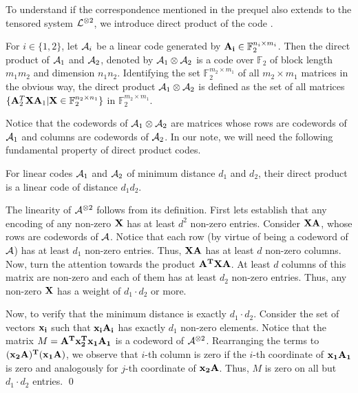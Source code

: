 {To understand if the correspondence mentioned in the prequel also
extends to the tensored system ${\cal L}^{\otimes 2}$, we introduce direct
product of the code \cite{ECC}. %
\begin{definition}
  For $i \in \{1, 2\}$, let ${\cal A}_i$ be a linear code generated by ${\bf
    A_i} \in \mathbb{F}_2^{n_i \times m_i}$.  Then the direct product
  of ${\cal A}_1$ and ${\cal A}_2$, denoted by ${\cal A}_1 \otimes {\cal A}_2$ is a code over
  $\mathbb{F}_2$ of block length $m_1m_2$ and dimension
  $n_1n_2$. Identifying the set $\mathbb{F}_2^{m_2 \times m_1}$ of all
  $m_2 \times m_1$ matrices in the obvious way, the direct product
  ${\cal A}_1 \otimes {\cal A}_2$ is defined as the set of all matrices $\{{\bf
    A}_2^T {\bf XA}_1 | {\bf X} \in \mathbb{F}_2^{n_2 \times n_1} \}$
  in $\mathbb{F}_2^{m_2 \times m_1}$.
\end{definition}

Notice that the codewords of ${\cal A}_1 \otimes {\cal A}_2$ are matrices whose
rows are codewords of ${\cal A}_1$ and columns are codewords of ${\cal A}_2$. In
our note, we will need the following fundamental property of direct
product codes.

\begin{claim} \label{distance} For linear codes ${\cal A}_1$ and ${\cal A}_2$ of
  minimum distance $d_1$ and $d_2$, their direct product is a linear
  code of distance $d_1d_2$.
\end{claim}
 The linearity of ${\cal A}^{\otimes 2}$ follows from
its definition.  First lets establish that any encoding of any
non-zero ${\bf X}$ has at least $d^2$ non-zero entries.  Consider
${\bf XA}$, whose rows are codewords of ${\cal A}$. Notice that each row (by
virtue of being a codeword of ${\cal A}$) has at least $d_1$ non-zero
entries. Thus, ${\bf XA}$ has at least $d$ non-zero columns.  Now,
turn the attention towards the product ${\bf A^{T}XA}$. At least $d$
columns of this matrix are non-zero and each of them has at least
$d_2$ non-zero entries. Thus, any non-zero ${\bf X}$ has a weight of
$d_1\cdot d_2$ or more.

Now, to verify that the minimum distance is exactly $d_1 \cdot
d_2$. Consider the set of vectors ${\bf x_i}$ such that ${\bf x_iA_i}$
has exactly $d_1$ non-zero elements. Notice that the matrix $M = {\bf
  A^{T}x_{2}^{T}x_1A_1}$ is a codeword of ${\cal A}^{\otimes
  2}$. Rearranging the terms to ${\bf (x_{2}A)^{T}(x_1A)}$, we observe
that $i$-th column is zero if the $i$-th coordinate of ${\bf x_1A_1}$
is zero and analogously for $j$-th coordinate of ${\bf x_2A}$. Thus,
$M$ is zero on all but $d_1 \cdot d_2$ entries. \qed



}
